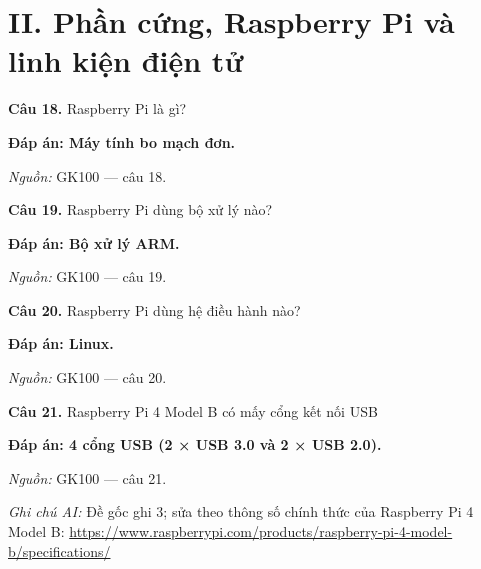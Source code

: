 \documentclass[11pt,a4paper]{article}
\begin{document}
\section*{II. Phần cứng, Raspberry Pi và linh kiện điện tử}

\textbf{Câu 18.} Raspberry Pi là gì?\par
{\color{answer}\textbf{Đáp án: Máy tính bo mạch đơn.}}\par
{\footnotesize\color{sourcegray}\textit{Nguồn:} GK100 — câu 18.\par}
\vspace{3pt}\par\noindent{\color{black!18}\rule{\linewidth}{0.3pt}}\par\medskip

\textbf{Câu 19.} Raspberry Pi dùng bộ xử lý nào?\par
{\color{answer}\textbf{Đáp án: Bộ xử lý ARM.}}\par
{\footnotesize\color{sourcegray}\textit{Nguồn:} GK100 — câu 19.\par}
\vspace{3pt}\par\noindent{\color{black!18}\rule{\linewidth}{0.3pt}}\par\medskip

\textbf{Câu 20.} Raspberry Pi dùng hệ điều hành nào?\par
{\color{answer}\textbf{Đáp án: Linux.}}\par
{\footnotesize\color{sourcegray}\textit{Nguồn:} GK100 — câu 20.\par}
\vspace{3pt}\par\noindent{\color{black!18}\rule{\linewidth}{0.3pt}}\par\medskip

\textbf{Câu 21.} Raspberry Pi 4 Model B có mấy cổng kết nối USB\par
{\color{answer}\textbf{Đáp án: 4 cổng USB (2 × USB 3.0 và 2 × USB 2.0).}}\par
{\footnotesize\color{sourcegray}\textit{Nguồn:} GK100 — câu 21.\par}
{\footnotesize\color{sourcegray}\textit{Ghi chú AI:} Đề gốc ghi 3; sửa theo thông số chính thức của Raspberry Pi 4 Model B: \url{https://www.raspberrypi.com/products/raspberry-pi-4-model-b/specifications/}\par}
\vspace{3pt}\par\noindent{\color{black!18}\rule{\linewidth}{0.3pt}}\par\medskip
\end{document}
